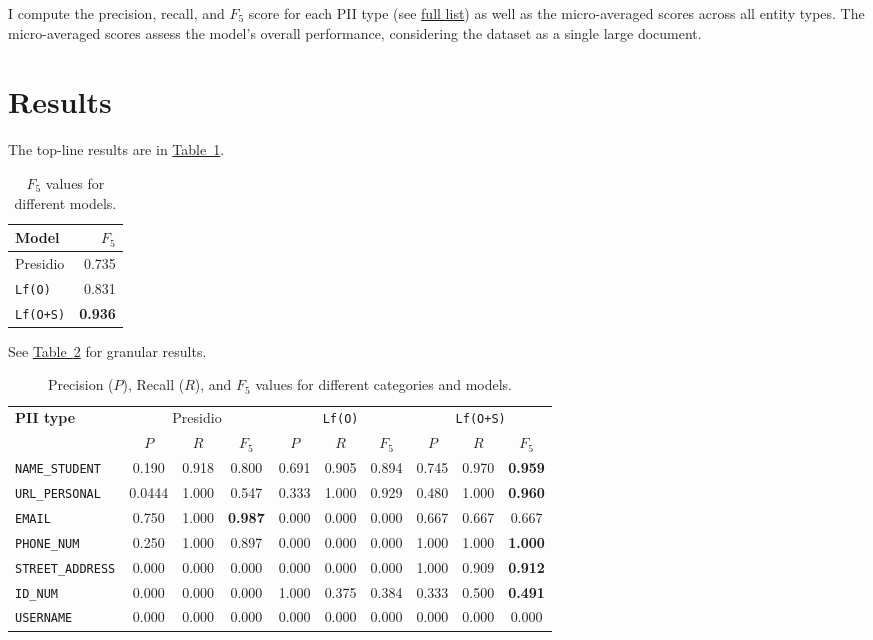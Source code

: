 \documentclass[11pt]{article}
\newcommand{\Tablink}[1]{\hyperref[#1]{Table~\ref*{#1}}}
\begin{document}
I compute the precision, recall, and $F_5$ score for each PII type (see \hyperref[par:pii_types]{full list}) as well as the micro-averaged scores across all entity types. The micro-averaged scores assess the model's overall performance, considering the dataset as a single large document.

\section{Results} 

The top-line results are in \Tablink{tab:f5_values}.

\begin{table}[h!]
  \centering
  \caption{$F_5$ values for different models.}
  \label{tab:f5_values}
  \begin{tabular}{lr}
  \toprule
  \textbf{Model} & \textbf{$F_5$} \\
  \midrule
  Presidio & 0.735 \\
  \texttt{Lf(O)} & 0.831 \\
  \texttt{Lf(O+S)} & \textbf{0.936} \\
  \bottomrule
  \end{tabular}
\end{table}

See \Tablink{tab:precision_recall_f5} for granular results. 

\begin{table}[t]
  \centering
  \caption{Precision ($P$), Recall ($R$), and $F_5$ values for different categories and models.}
  \label{tab:precision_recall_f5}
  \begin{tabularx}{\textwidth}{Xccccccccc}
    \toprule
    \textbf{PII type} & \multicolumn{3}{c}{Presidio} & \multicolumn{3}{c}{\texttt{Lf(O)}} & \multicolumn{3}{c}{\texttt{Lf(O+S)}} \\
    \cmidrule(lr){2-4} \cmidrule(lr){5-7} \cmidrule(lr){8-10}
    & $P$ & $R$ & $F_5$ & $P$ & $R$ & $F_5$ & $P$ & $R$ & $F_5$ \\
    \midrule
    \texttt{NAME\_STUDENT}     & 0.190 & 0.918 & 0.800 & 0.691 & 0.905 & 0.894 & 0.745 & 0.970 & \textbf{0.959} \\
    \texttt{URL\_PERSONAL}     & 0.0444 & 1.000 & 0.547 & 0.333 & 1.000 & 0.929 & 0.480 & 1.000 & \textbf{0.960} \\
    \texttt{EMAIL}             & 0.750 & 1.000 & \textbf{0.987} & 0.000 & 0.000 & 0.000 & 0.667 & 0.667 & 0.667 \\
    \texttt{PHONE\_NUM}        & 0.250 & 1.000 & 0.897 & 0.000 & 0.000 & 0.000 & 1.000 & 1.000 & \textbf{1.000} \\
    \texttt{STREET\_ADDRESS}   & 0.000 & 0.000 & 0.000 & 0.000 & 0.000 & 0.000 & 1.000 & 0.909 & \textbf{0.912} \\
    \texttt{ID\_NUM}           & 0.000 & 0.000 & 0.000 & 1.000 & 0.375 & 0.384 & 0.333 & 0.500 & \textbf{0.491} \\
    \texttt{USERNAME}          & 0.000 & 0.000 & 0.000 & 0.000 & 0.000 & 0.000 & 0.000 & 0.000 & 0.000 \\
    \bottomrule
  \end{tabularx}
\end{table}
\end{document}
